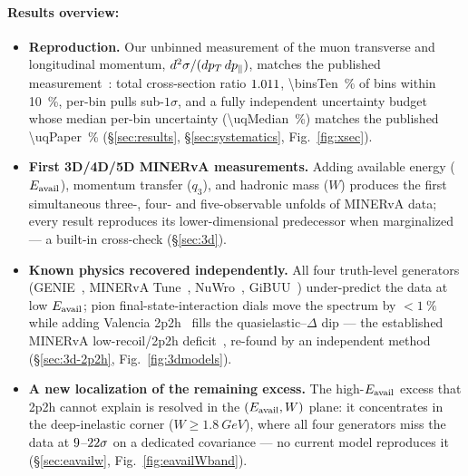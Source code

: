 \paragraph{Results overview:}
\begin{itemize}[itemsep=2pt]
  \item \textbf{Reproduction.} 
  Our unbinned measurement of the muon transverse and longitudinal momentum,  $d^{2}\sigma/(dp_{T}\,dp_{\parallel})$, matches the published measurement~\cite{MINERvA:2021owq}: total cross-section ratio $1.011$, \SI{\binsTen}{\percent} of bins within \SI{10}{\percent}, per-bin pulls sub-$1\sigma$, and a fully independent uncertainty budget whose median per-bin uncertainty (\SI{\uqMedian}{\percent}) matches the published \SI{\uqPaper}{\percent} (\S\ref{sec:results}, \S\ref{sec:systematics}, Fig.~\ref{fig:xsec}).
  
  \item \textbf{First 3D/4D/5D MINERvA measurements.} 
  Adding available energy ($E_{\mathrm{avail}}$), momentum transfer ($q_{3}$), and hadronic mass ($W$) produces the first simultaneous three-, four- and five-observable unfolds of MINERvA data; every result reproduces its lower-dimensional predecessor when marginalized --- a built-in cross-check (\S\ref{sec:3d}).
  
  \item \textbf{Known physics recovered independently.} 
  All four truth-level generators (GENIE~\cite{Andreopoulos:2009rq}, MINERvA Tune~\cite{MINERvA:2016lowrecoil}, NuWro~\cite{Golan:2012wx}, GiBUU~\cite{Buss:2011mx}) under-predict the data at low $E_{\mathrm{avail}}$; pion final-state-interaction dials move the spectrum by $<\SI{1}{\percent}$ while adding Valencia 2p2h~\cite{Nieves:2011pp,Gran:2013kda} fills the quasielastic--$\Delta$ dip --- the established MINERvA low-recoil/2p2h deficit~\cite{MINERvA:2016lowrecoil,MINERvA:2022incl}, re-found by an independent method (\S\ref{sec:3d-2p2h}, Fig.~\ref{fig:3dmodels}).
  
  \item \textbf{A new localization of the remaining excess.} 
  The high-$E_{\mathrm{avail}}$ excess that 2p2h cannot explain is resolved in the $(E_{\mathrm{avail}}, W)$ plane: it concentrates in the deep-inelastic corner ($W\ge\SI{1.8}{GeV}$), where all four generators miss the data at $9$--$22\sigma$ on a dedicated covariance --- no current model reproduces it (\S\ref{sec:eavailw}, Fig.~\ref{fig:eavailWband}).
  

\end{itemize}
